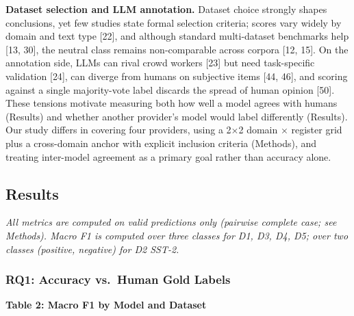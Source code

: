 \documentclass[11pt]{article}
\begin{document}
\textbf{Dataset selection and LLM annotation.} Dataset choice strongly
shapes conclusions, yet few studies state formal selection criteria;
scores vary widely by domain and text type {[}22{]}, and although
standard multi-dataset benchmarks help {[}13, 30{]}, the neutral class
remains non-comparable across corpora {[}12, 15{]}. On the annotation
side, LLMs can rival crowd workers {[}23{]} but need task-specific
validation {[}24{]}, can diverge from humans on subjective items {[}44,
46{]}, and scoring against a single majority-vote label discards the
spread of human opinion {[}50{]}. These tensions motivate measuring both
how well a model agrees with humans (Results) and whether another
provider's model would label differently (Results). Our study differs in
covering four providers, using a 2$\times$2 domain $\times$ register grid plus a
cross-domain anchor with explicit inclusion criteria (Methods), and
treating inter-model agreement as a primary goal rather than accuracy
alone.

\subsection{Results}\label{results}

\emph{All metrics are computed on valid predictions only (pairwise
complete case; see Methods). Macro F1 is computed over three classes for
D1, D3, D4, D5; over two classes (positive, negative) for D2 SST-2.}

\subsubsection{RQ1: Accuracy vs.~Human Gold
Labels}\label{rq1-accuracy-vs.-human-gold-labels}

\textbf{Table 2: Macro F1 by Model and Dataset}
\end{document}
